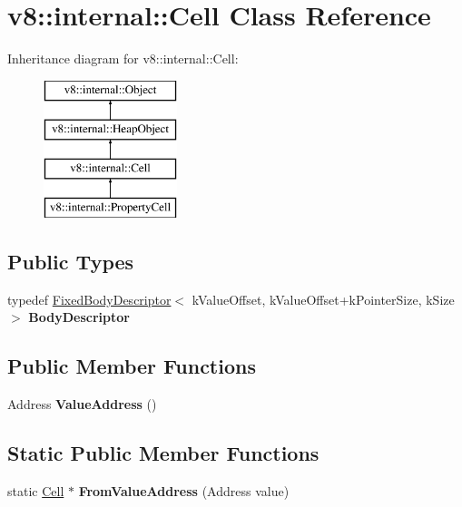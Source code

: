 \hypertarget{classv8_1_1internal_1_1_cell}{}\section{v8\+:\+:internal\+:\+:Cell Class Reference}
\label{classv8_1_1internal_1_1_cell}
Inheritance diagram for v8\+:\+:internal\+:\+:Cell\+:\begin{figure}[H]
\begin{center}
\leavevmode
\includegraphics[height=4.000000cm]{classv8_1_1internal_1_1_cell}
\end{center}
\end{figure}
\subsection*{Public Types}
\begin{DoxyCompactItemize}
\item 
\hypertarget{classv8_1_1internal_1_1_cell_aab877bcc5c92876e1a09e984428a63fb}{}typedef \hyperlink{classv8_1_1internal_1_1_fixed_body_descriptor}{Fixed\+Body\+Descriptor}$<$ k\+Value\+Offset, k\+Value\+Offset+k\+Pointer\+Size, k\+Size $>$ {\bfseries Body\+Descriptor}\label{classv8_1_1internal_1_1_cell_aab877bcc5c92876e1a09e984428a63fb}

\end{DoxyCompactItemize}
\subsection*{Public Member Functions}
\begin{DoxyCompactItemize}
\item 
\hypertarget{classv8_1_1internal_1_1_cell_a118c6eaad39cc63e6468b83a4697edee}{}Address {\bfseries Value\+Address} ()\label{classv8_1_1internal_1_1_cell_a118c6eaad39cc63e6468b83a4697edee}

\end{DoxyCompactItemize}
\subsection*{Static Public Member Functions}
\begin{DoxyCompactItemize}
\item 
\hypertarget{classv8_1_1internal_1_1_cell_ae7cb48a49636c3389d4dbfa21c06e340}{}static \hyperlink{classv8_1_1internal_1_1_cell}{Cell} $\ast$ {\bfseries From\+Value\+Address} (Address value)\label{classv8_1_1internal_1_1_cell_ae7cb48a49636c3389d4dbfa21c06e340}

\end{DoxyCompactItemize}
